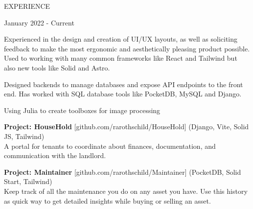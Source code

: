 \documentclass{resume} %
\begin{document}
\begin{newSection}{EXPERIENCE}

     {January 2022 - Current}   \vspace{1mm}
    \begin{myList}
        \item Experienced in the design and creation of UI/UX layouts, as well as soliciting feedback to make the most ergonomic and aesthetically pleasing product possible. Used to working with many common frameworks like React and Tailwind but also new tools like Solid and Astro.
        \item Designed backends to manage databases and expose API endpoints to the front end. Has worked with SQL database tools like PocketDB, MySQL and Django.
        \item Using Julia to create toolboxes for image processing
        \item {\bf Project: HouseHold} [github.com/rarothschild/HouseHold] (Django, Vite, Solid JS, Tailwind)\\
        A portal for tenants to coordinate about finances, documentation, and communication with the landlord.
        \item {\bf Project: Maintainer} [github.com/rarothschild/Maintainer] (PocketDB, Solid Start, Tailwind)\\
        Keep track of all the maintenance you do on any asset you have. Use this history as quick way to get detailed insights while buying or selling an asset.
    \end{myList}\vspace{1.5mm}
    

\end{newSection}
\end{document}
